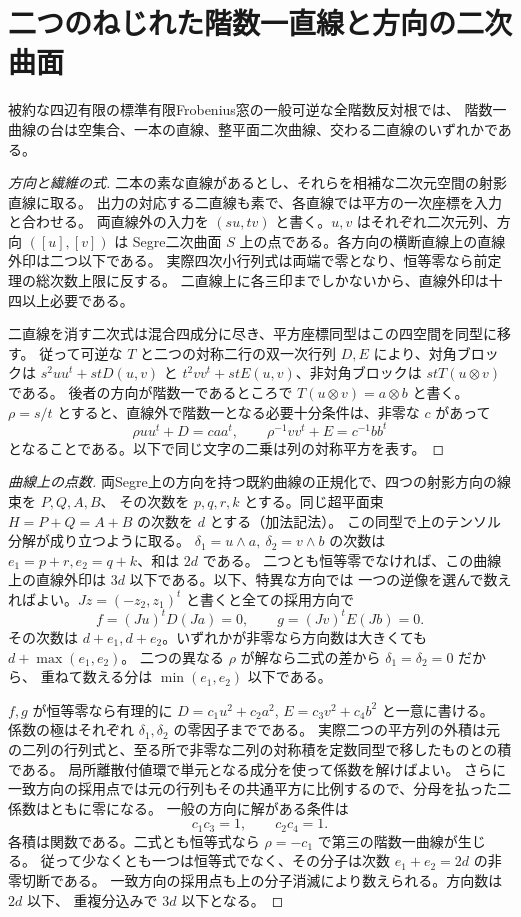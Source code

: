 \section{二つのねじれた階数一直線と方向の二次曲面}
\label{sec:rank-one-skew-pair-exclusion}
\begin{theorem}\label{thm:rank-one-skew-pair-exclusion}
被約な四辺有限の標準有限Frobenius窓の一般可逆な全階数反対根では、
階数一曲線の台は空集合、一本の直線、整平面二次曲線、交わる二直線のいずれかである。
\end{theorem}
\begin{proof}[方向と繊維の式]
二本の素な直線があるとし、それらを相補な二次元空間の射影直線に取る。
出力の対応する二直線も素で、各直線では平方の一次座標を入力と合わせる。
両直線外の入力を $(s u,t v)$ と書く。$u,v$ はそれぞれ二次元列、方向 $([u],[v])$ は
Segre二次曲面 $S$ 上の点である。各方向の横断直線上の直線外印は二つ以下である。
実際四次小行列式は両端で零となり、恒等零なら前定理の総次数上限に反する。
二直線上に各三印までしかないから、直線外印は十四以上必要である。

二直線を消す二次式は混合四成分に尽き、平方座標同型はこの四空間を同型に移す。
従って可逆な $T$ と二つの対称二行の双一次行列 $D,E$ により、対角ブロックは
$s^2uu^t+stD(u,v)$ と $t^2vv^t+stE(u,v)$、非対角ブロックは $st T(u\otimes v)$ である。
後者の方向が階数一であるところで $T(u\otimes v)=a\otimes b$ と書く。
$\rho=s/t$ とすると、直線外で階数一となる必要十分条件は、非零な $c$ があって
\[
        \rho uu^t+D=c aa^t,\qquad \rho^{-1}vv^t+E=c^{-1}bb^t
\]
となることである。以下で同じ文字の二乗は列の対称平方を表す。
\end{proof}
\begin{proof}[曲線上の点数]
両Segre上の方向を持つ既約曲線の正規化で、四つの射影方向の線束を $P,Q,A,B$、
その次数を $p,q,r,k$ とする。同じ超平面束 $H=P+Q=A+B$ の次数を $d$ とする（加法記法）。
この同型で上のテンソル分解が成り立つように取る。
$\delta_1=u\wedge a,\ \delta_2=v\wedge b$ の次数は $e_1=p+r,e_2=q+k$、和は $2d$ である。
二つとも恒等零でなければ、この曲線上の直線外印は $3d$ 以下である。以下、特異な方向では
一つの逆像を選んで数えればよい。$Jz=(-z_2,z_1)^t$ と書くと全ての採用方向で
\[
        f=(Ju)^tD(Ja)=0,\qquad g=(Jv)^tE(Jb)=0 .
\]
その次数は $d+e_1,d+e_2$。いずれかが非零なら方向数は大きくても $d+\max(e_1,e_2)$。
二つの異なる $\rho$ が解なら二式の差から $\delta_1=\delta_2=0$ だから、
重ねて数える分は $\min(e_1,e_2)$ 以下である。

$f,g$ が恒等零なら有理的に $D=c_1u^2+c_2a^2$, $E=c_3v^2+c_4b^2$ と一意に書ける。
係数の極はそれぞれ $\delta_1,\delta_2$ の零因子までである。
実際二つの平方列の外積は元の二列の行列式と、至る所で非零な二列の対称積を定数同型で移したものとの積である。
局所離散付値環で単元となる成分を使って係数を解けばよい。
さらに一致方向の採用点では元の行列もその共通平方に比例するので、分母を払った二係数はともに零になる。
一般の方向に解がある条件は
\[
                         c_1 c_3=1,\qquad c_2 c_4=1 .
\]
各積は関数である。二式とも恒等式なら $\rho=-c_1$ で第三の階数一曲線が生じる。
従って少なくとも一つは恒等式でなく、その分子は次数 $e_1+e_2=2d$ の非零切断である。
一致方向の採用点も上の分子消滅により数えられる。方向数は $2d$ 以下、
重複分込みで $3d$ 以下となる。
\end{proof}
